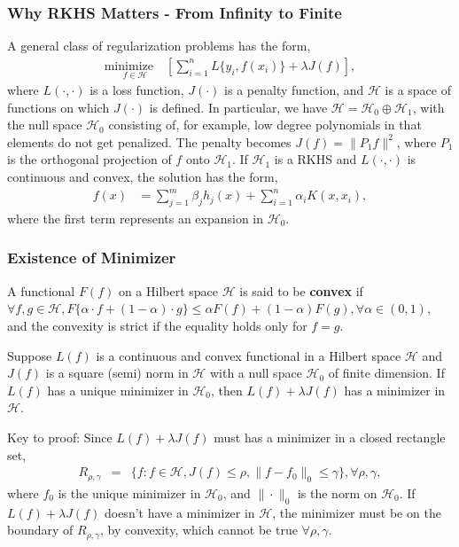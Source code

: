 \documentclass[notes=no]{beamer}
\def\cal{\mathcal}
\def\minimize{\mathrm{minimize}\quad }
\begin{document}
\begin{frame}
	\frametitle{Why RKHS Matters - From Infinity to Finite}
	A general class of regularization problems has the form,
	\begin{eqnarray*}
		\underset{f \in {\cal H}} {\minimize}  \left[\sum_{i=1}^n L\{y_i, f(x_i)\} + \lambda J(f) \right],
	\end{eqnarray*}
	where $L(\cdot, \cdot)$ is a loss function, $J(\cdot)$ is a penalty function, and ${\cal H}$ is a space of functions on which $J(\cdot)$ is defined. In particular, we have ${\cal H} = {\cal H}_0\oplus{\cal H}_1$, with the null space ${\cal H}_0$ consisting of, for example, low degree polynomials in that elements do not get penalized. The penalty becomes $J(f)=\|P_1f\|^2$, where $P_1$ is the orthogonal projection of $f$ onto ${\cal H}_1$. If ${\cal H}_1$ is a RKHS and $L(\cdot, \cdot)$ is continuous and convex, the solution has the form,
	\begin{align*}
		f(x) &= \sum_{j=1}^m \beta_j h_j(x) + \sum_{i=1}^n \alpha_i K(x,x_i),
	\end{align*}
	where the first term represents an expansion in ${\cal H}_0$.
\end{frame}




\begin{frame}
	\frametitle{Existence of Minimizer}
	A functional $F(f)$ on a Hilbert space ${\cal H}$ is said to be \textbf{convex} if $\forall f,g \in {\cal H}, F\{\alpha\cdot f +(1-\alpha)\cdot g\} \le \alpha F(f)+(1-\alpha)F(g), \forall \alpha \in (0,1)$, and the convexity is strict if the equality holds only for $f=g$.
	
	\begin{theorem}[Existence]
		Suppose $L(f)$ is a continuous and convex functional in a Hilbert space ${\cal H}$ and $J(f)$ is a square (semi) norm in ${\cal H}$ with a null space ${\cal H}_0$ of finite dimension. If $L(f)$ has a unique minimizer in ${\cal H}_0$, then $L(f)+\lambda J(f)$ has a minimizer in ${\cal H}$.
	\end{theorem}
	Key to proof: Since $L(f)+\lambda J(f)$ must has a minimizer in a closed rectangle set,
	\begin{eqnarray*}
		R_{\rho,\gamma} &=& \{f: f \in {\cal H}, J(f) \le \rho, \|f-f_0\|_0 \le \gamma \},  \forall \rho, \gamma, 
	\end{eqnarray*}
	where $f_0$ is the unique minimizer in ${\cal H}_0$, and $\|\cdot\|_0$ is the norm on ${\cal H}_0$. If $L(f)+\lambda J(f)$ doesn't have a minimizer in ${\cal H}$, the minimizer must be on the boundary of $R_{\rho,\gamma}$, by convexity,  which cannot be true $\forall \rho, \gamma$.
\end{frame}
\end{document}
